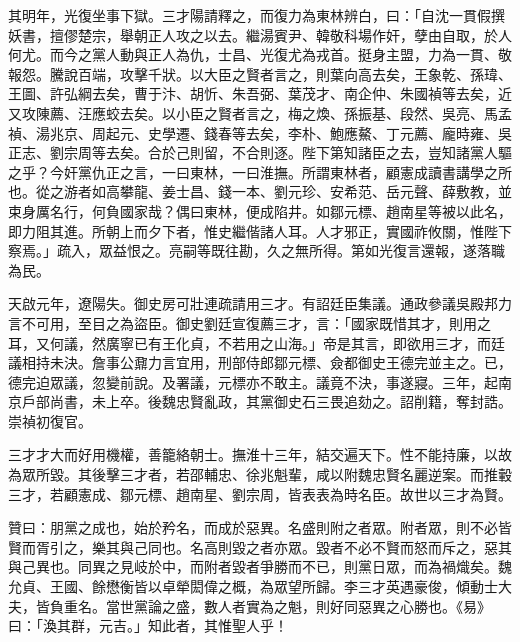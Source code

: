 \begin{pinyinscope}
其明年，光復坐事下獄。三才陽請釋之，而復力為東林辨白，曰：「自沈一貫假撰妖書，擅僇楚宗，舉朝正人攻之以去。繼湯賓尹、韓敬科場作奸，孽由自取，於人何尤。而今之黨人動與正人為仇，士昌、光復尤為戎首。挺身主盟，力為一貫、敬報怨。騰說百端，攻擊千狀。以大臣之賢者言之，則葉向高去矣，王象乾、孫瑋、王圖、許弘綱去矣，曹于汴、胡忻、朱吾弼、葉茂才、南企仲、朱國禎等去矣，近又攻陳薦、汪應蛟去矣。以小臣之賢者言之，梅之煥、孫振基、段然、吳亮、馬孟禎、湯兆京、周起元、史學遷、錢春等去矣，李朴、鮑應鰲、丁元薦、龐時雍、吳正志、劉宗周等去矣。合於己則留，不合則逐。陛下第知諸臣之去，豈知諸黨人驅之乎？今奸黨仇正之言，一曰東林，一曰淮撫。所謂東林者，顧憲成讀書講學之所也。從之游者如高攀龍、姜士昌、錢一本、劉元珍、安希范、岳元聲、薛敷教，並束身厲名行，何負國家哉？偶曰東林，便成陷井。如鄒元標、趙南星等被以此名，即力阻其進。所朝上而夕下者，惟史繼偕諸人耳。人才邪正，實國祚攸關，惟陛下察焉。」疏入，眾益恨之。亮嗣等既往勘，久之無所得。第如光復言還報，遂落職為民。

天啟元年，遼陽失。御史房可壯連疏請用三才。有詔廷臣集議。通政參議吳殿邦力言不可用，至目之為盜臣。御史劉廷宣復薦三才，言：「國家既惜其才，則用之耳，又何議，然廣寧已有王化貞，不若用之山海。」帝是其言，即欲用三才，而廷議相持未決。詹事公鼐力言宜用，刑部侍郎鄒元標、僉都御史王德完並主之。已，德完迫眾議，忽變前說。及署議，元標亦不敢主。議竟不決，事遂寢。三年，起南京戶部尚書，未上卒。後魏忠賢亂政，其黨御史石三畏追劾之。詔削籍，奪封誥。崇禎初復官。

三才才大而好用機權，善籠絡朝士。撫淮十三年，結交遍天下。性不能持廉，以故為眾所毀。其後擊三才者，若邵輔忠、徐兆魁輩，咸以附魏忠賢名麗逆案。而推轂三才，若顧憲成、鄒元標、趙南星、劉宗周，皆表表為時名臣。故世以三才為賢。

贊曰：朋黨之成也，始於矜名，而成於惡異。名盛則附之者眾。附者眾，則不必皆賢而胥引之，樂其與己同也。名高則毀之者亦眾。毀者不必不賢而怒而斥之，惡其與己異也。同異之見岐於中，而附者毀者爭勝而不已，則黨日眾，而為禍熾矣。魏允貞、王國、餘懋衡皆以卓犖閎偉之概，為眾望所歸。李三才英遇豪俊，傾動士大夫，皆負重名。當世黨論之盛，數人者實為之魁，則好同惡異之心勝也。《易》曰：「渙其群，元吉。」知此者，其惟聖人乎！


\end{pinyinscope}